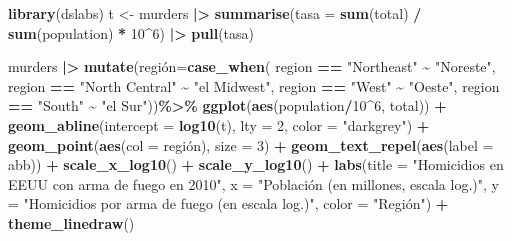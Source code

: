 \documentclass[
]{article}
\newenvironment{Shaded}{\begin{snugshade}}{\end{snugshade}}
\newcommand{\AttributeTok}[1]{\textcolor[rgb]{0.13,0.29,0.53}{#1}}
\newcommand{\DecValTok}[1]{\textcolor[rgb]{0.00,0.00,0.81}{#1}}
\newcommand{\FunctionTok}[1]{\textcolor[rgb]{0.13,0.29,0.53}{\textbf{#1}}}
\newcommand{\NormalTok}[1]{#1}
\newcommand{\OtherTok}[1]{\textcolor[rgb]{0.56,0.35,0.01}{#1}}
\newcommand{\SpecialCharTok}[1]{\textcolor[rgb]{0.81,0.36,0.00}{\textbf{#1}}}
\newcommand{\StringTok}[1]{\textcolor[rgb]{0.31,0.60,0.02}{#1}}
\begin{document}
\begin{Shaded}
\begin{Highlighting}[]
\FunctionTok{library}\NormalTok{(dslabs)}
\NormalTok{t }\OtherTok{\textless{}{-}}\NormalTok{ murders }\SpecialCharTok{|\textgreater{}} 
  \FunctionTok{summarise}\NormalTok{(}\AttributeTok{tasa =} \FunctionTok{sum}\NormalTok{(total) }\SpecialCharTok{/}  \FunctionTok{sum}\NormalTok{(population) }\SpecialCharTok{*} \DecValTok{10}\SpecialCharTok{\^{}}\DecValTok{6}\NormalTok{) }\SpecialCharTok{|\textgreater{}}
  \FunctionTok{pull}\NormalTok{(tasa)}

\NormalTok{murders }\SpecialCharTok{|\textgreater{}} 
  \FunctionTok{mutate}\NormalTok{(región}\OtherTok{=}\FunctionTok{case\_when}\NormalTok{(}
\NormalTok{    region }\SpecialCharTok{==} \StringTok{"Northeast"} \SpecialCharTok{\textasciitilde{}} \StringTok{"Noreste"}\NormalTok{,}
\NormalTok{    region }\SpecialCharTok{==} \StringTok{"North Central"} \SpecialCharTok{\textasciitilde{}} \StringTok{"el Midwest"}\NormalTok{,}
\NormalTok{    region }\SpecialCharTok{==} \StringTok{"West"} \SpecialCharTok{\textasciitilde{}} \StringTok{"Oeste"}\NormalTok{,}
\NormalTok{    region }\SpecialCharTok{==} \StringTok{"South"} \SpecialCharTok{\textasciitilde{}} \StringTok{"el Sur"}\NormalTok{))}\SpecialCharTok{\%\textgreater{}\%}
  \FunctionTok{ggplot}\NormalTok{(}\FunctionTok{aes}\NormalTok{(population}\SpecialCharTok{/}\DecValTok{10}\SpecialCharTok{\^{}}\DecValTok{6}\NormalTok{, total)) }\SpecialCharTok{+}   
  \FunctionTok{geom\_abline}\NormalTok{(}\AttributeTok{intercept =} \FunctionTok{log10}\NormalTok{(t), }\AttributeTok{lty =} \DecValTok{2}\NormalTok{, }\AttributeTok{color =} \StringTok{"darkgrey"}\NormalTok{) }\SpecialCharTok{+}
  \FunctionTok{geom\_point}\NormalTok{(}\FunctionTok{aes}\NormalTok{(}\AttributeTok{col =}\NormalTok{ región), }\AttributeTok{size =} \DecValTok{3}\NormalTok{) }\SpecialCharTok{+}
  \FunctionTok{geom\_text\_repel}\NormalTok{(}\FunctionTok{aes}\NormalTok{(}\AttributeTok{label =}\NormalTok{ abb)) }\SpecialCharTok{+} 
  \FunctionTok{scale\_x\_log10}\NormalTok{() }\SpecialCharTok{+}
  \FunctionTok{scale\_y\_log10}\NormalTok{() }\SpecialCharTok{+}
  \FunctionTok{labs}\NormalTok{(}\AttributeTok{title =} \StringTok{"Homicidios en EEUU con arma de fuego en 2010"}\NormalTok{,}
       \AttributeTok{x =} \StringTok{"Población (en millones, escala log.)"}\NormalTok{, }
       \AttributeTok{y =} \StringTok{"Homicidios por arma de fuego (en escala log.)"}\NormalTok{,}
       \AttributeTok{color =} \StringTok{"Región"}\NormalTok{) }\SpecialCharTok{+}
  \FunctionTok{theme\_linedraw}\NormalTok{()}
\end{Highlighting}
\end{Shaded}
\end{document}
